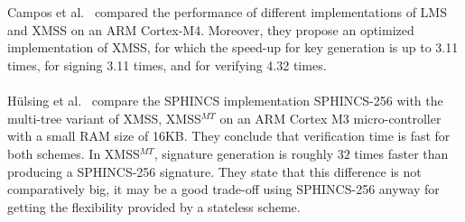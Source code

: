 \\  \\
Campos et al.~\cite{fabio_paper_lms_vs_xmss} compared the performance of different implementations of LMS and XMSS on an ARM Cortex-M4. Moreover, they propose an optimized implementation of XMSS, for which the speed-up for key generation is up to 3.11 times, for signing 3.11 times, and for verifying 4.32 times.
\\ \\
Hülsing et al.~\cite{armed_sphincs_2015} compare the SPHINCS implementation SPHINCS-256 with the multi-tree variant of XMSS, XMSS$^{MT}$ on an ARM Cortex M3 micro-controller with a small RAM size of 16KB. They conclude that verification time is fast for both schemes. In XMSS$^{MT}$, signature generation is roughly $32$ times faster than producing a SPHINCS-256 signature. They state that this difference is not comparatively big, it may be a good trade-off using SPHINCS-256 anyway for getting the flexibility provided by a stateless scheme.



